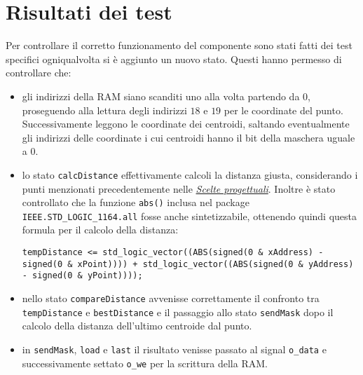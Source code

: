 \documentclass{article}
\begin{document}
	\section{Risultati dei test}
	Per controllare il corretto funzionamento del componente sono stati fatti dei test specifici ogniqualvolta si \`{e} aggiunto un nuovo stato. Questi hanno permesso di controllare che:
	\begin{itemize}
		\item gli indirizzi della RAM siano scanditi uno alla volta partendo da $0$, proseguendo alla lettura degli indirizzi $18$ e $19$ per le coordinate del punto. Successivamente leggono le coordinate dei centroidi, saltando eventualmente gli indirizzi delle coordinate i cui centroidi hanno il bit della maschera uguale a $0$.
		\item lo stato \texttt{calcDistance} effettivamente calcoli la distanza giusta, considerando i punti menzionati precedentemente nelle \hyperref[sec:scelte]{\textit{Scelte progettuali}}. Inoltre \`{e} stato controllato che la funzione \texttt{abs()} inclusa nel package \texttt{IEEE.STD\_LOGIC\_1164.all} fosse anche sintetizzabile, ottenendo quindi questa formula per il calcolo della distanza:
		\newline
		
		
		
		
		\texttt{tempDistance <= std\_logic\_vector((ABS(signed(\textsc{}0\textsc{} \& xAddress) - signed(\textsc{}0\textsc{} \& xPoint)))) + std\_logic\_vector((ABS(signed(\textsc{}0\textsc{} \& yAddress) - signed(\textsc{}0\textsc{} \& yPoint))));}
		
		\item nello stato \texttt{compareDistance} avvenisse correttamente il confronto tra \texttt{tempDistance} e \texttt{bestDistance} e il passaggio allo stato \texttt{sendMask} dopo il calcolo della distanza dell'ultimo centroide dal punto.
		\item in \texttt{sendMask}, \texttt{load} e \texttt{last} il risultato venisse passato al signal \texttt{o\_data} e successivamente settato \texttt{o\_we}  per la scrittura della RAM.
	\end{itemize}
\end{document}
